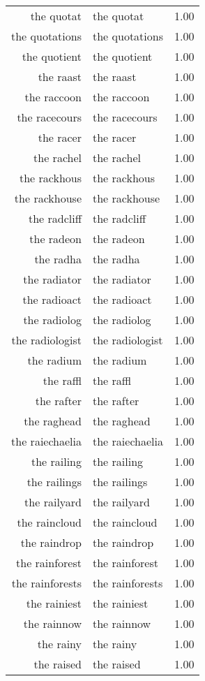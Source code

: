 \begin{table}[ht]
\begin{tabular}{rlr}
  the quotat & the quotat & 1.00 \\ 
  the quotations & the quotations & 1.00 \\ 
  the quotient & the quotient & 1.00 \\ 
  the raast & the raast & 1.00 \\ 
  the raccoon & the raccoon & 1.00 \\ 
  the racecours & the racecours & 1.00 \\ 
  the racer & the racer & 1.00 \\ 
  the rachel & the rachel & 1.00 \\ 
  the rackhous & the rackhous & 1.00 \\ 
  the rackhouse & the rackhouse & 1.00 \\ 
  the radcliff & the radcliff & 1.00 \\ 
  the radeon & the radeon & 1.00 \\ 
  the radha & the radha & 1.00 \\ 
  the radiator & the radiator & 1.00 \\ 
  the radioact & the radioact & 1.00 \\ 
  the radiolog & the radiolog & 1.00 \\ 
  the radiologist & the radiologist & 1.00 \\ 
  the radium & the radium & 1.00 \\ 
  the raffl & the raffl & 1.00 \\ 
  the rafter & the rafter & 1.00 \\ 
  the raghead & the raghead & 1.00 \\ 
  the raiechaelia & the raiechaelia & 1.00 \\ 
  the railing & the railing & 1.00 \\ 
  the railings & the railings & 1.00 \\ 
  the railyard & the railyard & 1.00 \\ 
  the raincloud & the raincloud & 1.00 \\ 
  the raindrop & the raindrop & 1.00 \\ 
  the rainforest & the rainforest & 1.00 \\ 
  the rainforests & the rainforests & 1.00 \\ 
  the rainiest & the rainiest & 1.00 \\ 
  the rainnow & the rainnow & 1.00 \\ 
  the rainy & the rainy & 1.00 \\ 
  the raised & the raised & 1.00 \\ 

\end{tabular}
\end{table}
